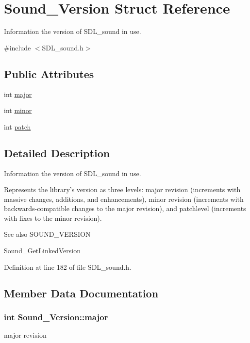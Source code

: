 \hypertarget{structSound__Version}{\section{Sound\-\_\-\-Version Struct Reference}
\label{structSound__Version}
}


Information the version of S\-D\-L\-\_\-sound in use.  




{\ttfamily \#include $<$S\-D\-L\-\_\-sound.\-h$>$}

\subsection*{Public Attributes}
\begin{DoxyCompactItemize}
\item 
int \hyperlink{structSound__Version_a68ed43edb6114f117edd45084baae1b4}{major}
\item 
int \hyperlink{structSound__Version_a095420931df560c545e0cf0d6fecf56a}{minor}
\item 
int \hyperlink{structSound__Version_a7ebc29f83c1a812ee24b556ad6dfc1f4}{patch}
\end{DoxyCompactItemize}


\subsection{Detailed Description}
Information the version of S\-D\-L\-\_\-sound in use. 

Represents the library's version as three levels\-: major revision (increments with massive changes, additions, and enhancements), minor revision (increments with backwards-\/compatible changes to the major revision), and patchlevel (increments with fixes to the minor revision).

\begin{DoxySeeAlso}{See also}
S\-O\-U\-N\-D\-\_\-\-V\-E\-R\-S\-I\-O\-N 

Sound\-\_\-\-Get\-Linked\-Version 
\end{DoxySeeAlso}


Definition at line 182 of file S\-D\-L\-\_\-sound.\-h.



\subsection{Member Data Documentation}
\hypertarget{structSound__Version_a68ed43edb6114f117edd45084baae1b4}{
\subsubsection[{major}]{\setlength{\rightskip}{0pt plus 5cm}int {\bf Sound\-\_\-\-Version\-::major}}}\label{structSound__Version_a68ed43edb6114f117edd45084baae1b4}
major revision 


